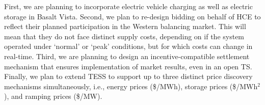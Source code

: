 First, we are planning to incorporate electric vehicle charging as well as electric storage in Basalt Vista. 
Second, we plan to re-design bidding on behalf of HCE to reflect their planned participation in the Western balancing market. This will mean that they do not face distinct supply costs, depending on if the system operated under `normal' or `peak' conditions, but for which costs can change in real-time.
Third, we are planning to design an incentive-compatible settlement mechanism that ensures implementation of market results, even in an open TS.
Finally, we plan to extend TESS to support up to three distinct price discovery mechanisms simultaneously, i.e., energy prices (\$/MWh), storage prices (\$/MWh$^2$), and ramping prices (\$/MW).



